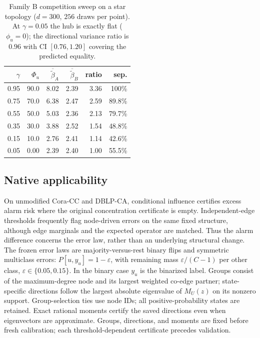 \documentclass[preprint,11pt]{elsarticle}
\begin{document}
\begin{table}[htbp]
\centering\small
\begin{tabular}{rrrrrr}
\toprule
$\gamma$ & $\Phi_u$ & $\overline{\widetilde\beta}_A$ &
$\overline{\widetilde\beta}_B$ & ratio & sep.\\
\midrule
0.95 & 90.0 & 8.02 & 2.39 & 3.36 & 100\%\\
0.75 & 70.0 & 6.38 & 2.47 & 2.59 & 89.8\%\\
0.55 & 50.0 & 5.03 & 2.36 & 2.13 & 79.7\%\\
0.35 & 30.0 & 3.88 & 2.52 & 1.54 & 48.8\%\\
0.15 & 10.0 & 2.76 & 2.41 & 1.14 & 42.6\%\\
0.05 & $0.00$ & 2.39 & 2.40 & 1.00 & 55.5\%\\
\bottomrule
\end{tabular}
\caption{Family B competition sweep on a star topology ($d{=}300$,
$256$ draws per point). At $\gamma=0.05$ the hub is exactly flat
($\phi_u=0$); the directional variance ratio is $0.96$ with CI
$[0.76,1.20]$ covering the predicted equality.}
\label{tab:familyB}
\end{table}

\subsection{Native applicability}\label{sec:native}

On unmodified Cora-CC and DBLP-CA, conditional influence certifies
excess alarm risk where the original concentration certificate is
empty. Independent-edge thresholds frequently flag node-driven
errors on the same fixed structure, although edge marginals and the
expected operator are matched. Thus the alarm difference concerns
the error law, rather than an underlying structural change.
The frozen error laws are majority-versus-rest binary flips
and symmetric multiclass errors: $P[u,y_u]=1-\varepsilon$, with
remaining mass $\varepsilon/(C-1)$ per other class,
$\varepsilon\in\{0.05,0.15\}$. In the binary case $y_u$ is the
binarized label. Groups consist of the maximum-degree node and its
largest weighted co-edge partner; state-specific directions follow
the largest absolute eigenvalue of $M_U(z)$ on its nonzero support.
Group-selection ties use node IDs; all positive-probability states
are retained. Exact rational moments certify the saved directions
even when eigenvectors are approximate. Groups, directions, and
moments are fixed before fresh calibration; each threshold-dependent
certificate precedes validation.
\end{document}
